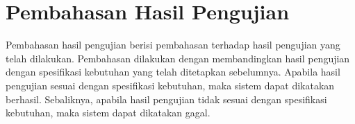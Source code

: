 \section{Pembahasan Hasil Pengujian}
Pembahasan hasil pengujian berisi pembahasan terhadap hasil pengujian yang telah dilakukan. Pembahasan dilakukan dengan membandingkan hasil pengujian dengan spesifikasi kebutuhan yang telah ditetapkan sebelumnya. Apabila hasil pengujian sesuai dengan spesifikasi kebutuhan, maka sistem dapat dikatakan berhasil. Sebaliknya, apabila hasil pengujian tidak sesuai dengan spesifikasi kebutuhan, maka sistem dapat dikatakan gagal.
